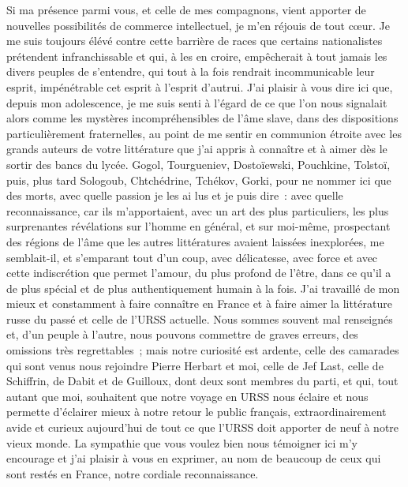 \documentclass[french,twoside]{book} %
\begin{document}
Si ma présence parmi vous, et celle de mes compagnons, vient apporter de nouvelles possibilités de commerce intellectuel, je m’en réjouis de tout cœur. Je me suis toujours élévé contre cette barrière de races que certains nationalistes prétendent infranchissable et qui, à les en croire, empêcherait à tout jamais les divers peuples de s’entendre, qui tout à la fois rendrait incommunicable leur esprit, impénétrable cet esprit à l’esprit d’autrui. J’ai plaisir à vous dire ici que, depuis mon adolescence, je me suis senti à l’égard de ce que l’on nous signalait alors comme les mystères incompréhensibles de l’âme slave, dans des dispositions particulièrement fraternelles, au point de me sentir en communion étroite avec les grands auteurs de votre littérature que j’ai appris à connaître et à aimer dès le sortir des bancs du lycée. Gogol, Tourgueniev, Dostoïewski, Pouchkine, Tolstoï, puis, plus tard Sologoub, Chtchédrine, Tchékov, Gorki, pour ne nommer ici que des morts, avec quelle passion je les ai lus et je puis dire : avec quelle reconnaissance, car ils m’apportaient, avec un art des plus particuliers, les plus surprenantes révélations sur l’homme en général, et sur moi-même, prospectant des régions de l’âme que les autres littératures avaient laissées inexplorées, me semblait-il, et s’emparant tout d’un coup, avec délicatesse, avec force et avec cette indiscrétion que permet l’amour, du plus profond de l’être, dans ce qu’il a de plus spécial et de plus authentiquement humain à la fois. J’ai travaillé de mon mieux et constamment à faire connaître en France et à faire aimer la littérature russe du passé et celle de l’URSS actuelle. Nous sommes souvent mal renseignés et, d’un peuple à l’autre, nous pouvons commettre de graves erreurs, des omissions très regrettables ; mais notre curiosité est ardente, celle des camarades qui sont venus nous rejoindre Pierre Herbart et moi, celle de Jef Last, celle de Schiffrin, de Dabit et de Guilloux, dont deux sont membres du parti, et qui, tout autant que moi, souhaitent que notre voyage en URSS nous éclaire et nous permette d’éclairer mieux à notre retour le public français, extraordinairement avide et curieux aujourd’hui de tout ce que l’URSS doit apporter de neuf à notre vieux monde. La sympathie que vous voulez bien nous témoigner ici m’y encourage et j’ai plaisir à vous en exprimer, au nom de beaucoup de ceux qui sont restés en France, notre cordiale reconnaissance.
\end{document}
